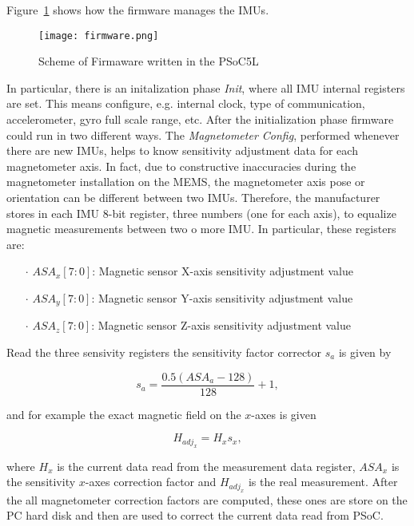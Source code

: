 Figure~\ref{fig:psocfirmware} shows how the firmware manages the IMUs. %
\begin{figure}[h]
\centering
\texttt{[image: firmware.png]}
\caption{Scheme of Firmaware written in the PSoC5L}
\label{fig:psocfirmware}
\end{figure}
In particular, there is an initalization phase \textit{Init}, where all IMU internal registers are set. This means configure, e.g. internal clock, type of communication, accelerometer, gyro full scale range, etc.
After the initialization phase firmware could run in two different ways. The \textit{Magnetometer Config}, performed whenever there are new IMUs, helps to know sensitivity adjustment data for each magnetometer axis. In fact, due to constructive inaccuracies during the magnetometer installation on the MEMS, the magnetometer axis pose or orientation can be different between two IMUs. Therefore, the manufacturer stores in each IMU 8-bit register, three numbers (one for each axis), to equalize magnetic measurements between two o more IMU. In particular, these registers are:

\begin{enumerate}
\item[$\cdot$] $ASA_x[7:0]$: Magnetic sensor X-axis sensitivity adjustment value
\item[$\cdot$] $ASA_y[7:0]$: Magnetic sensor Y-axis sensitivity adjustment value
\item[$\cdot$] $ASA_z[7:0]$: Magnetic sensor Z-axis sensitivity adjustment value
\end{enumerate}

Read the three sensivity registers the sensitivity factor corrector $s_a$ is given by %

\begin{equation}
s_a  = \frac{ 0.5(ASA_a - 128)}{128} + 1,
\end{equation}

\noindent and for example the exact magnetic field on the $x$-axes is given

\begin{equation}
H_{{adj}_x} = H_x s_x,
\end{equation}

\noindent where $H_x$ is the current data read from the measurement data register, $ASA_x$ is the sensitivity $x$-axes correction factor and $H_{{adj}_x}$ is the real measurement.
After the all magnetometer correction factors are computed, these ones are store on the PC hard disk and then are used to correct the current data read from PSoC. %

